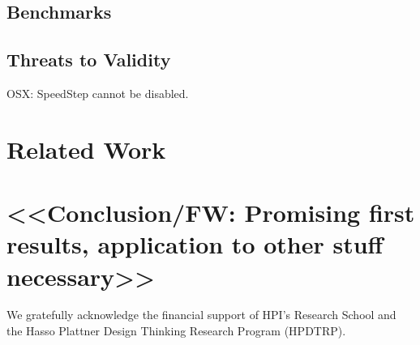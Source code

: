 \documentclass[preprint,english,10pt,nonatbib]{sigplanconf}
\begin{document}
\subsection{Benchmarks}


\subsection{Threats to Validity}

OSX: SpeedStep cannot be disabled.

\section{Related Work}

\section{<<Conclusion/FW: Promising first results, application to other stuff necessary>>}

\acks
We gratefully acknowledge the financial support of HPI's Research School and
the Hasso Plattner Design Thinking Research Program (HPDTRP).

\printbibliography

\end{document}
